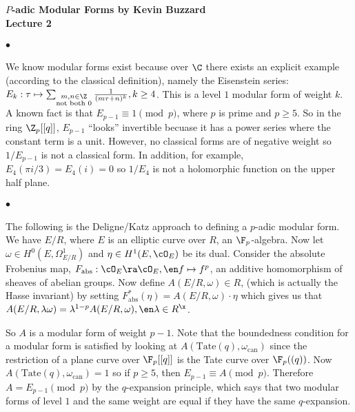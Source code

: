\documentclass[12pt]{article}
\begin{document}
\begin{center}
\Large \textbf{$P$-adic Modular Forms by Kevin Buzzard\\
Lecture 2}
\end{center}

\paragraph{$\bullet$}
We know modular forms exist because over $\C$ there exists an explicit
example (according to the classical definition), namely the Eisenstein
series: $E_k : \tau \mapsto \sum_{\substack{m,n\in\Z\\ \text{not both }0}}
\frac{1}{(m\tau + n)^k}, k \geq 4$.
This is a level $1$ modular form of weight $k$.
A known fact is that $E_{p-1} \equiv 1 \pmod{p}$, where $p$ is prime and $p
\geq 5$.
So in the ring $\Z_p[[q]]$, $E_{p-1}$ ``looks'' invertible becuase it has a
power series where the constant term is a unit.
However, no classical forms are of negative weight so $1/E_{p-1}$ is not a
classical form.
In addition, for example, $E_4(\pi i/3) = E_4(i) = 0$ so $1/E_4$ is not a
holomorphic function on the upper half plane.

\paragraph{$\bullet$}
The following is the Deligne/Katz approach to defining a $p$-adic modular
form.
\\

We have $E/R$, where $E$ is an elliptic curve over $R$, an $\F_p$-algebra.
Now let $\omega \in H^0(E, \Omega^1_{E/R})$ and $\eta \in H^1(E,\cO_E)$ be
its dual.
Consider the absolute Frobenius map, $F_{\text{abs}} : \cO_E \ra \cO_E,\en f
\mapsto f^p$, an additive homomorphism of sheaves of abelian groups.
Now define $A(E/R,\omega) \in R$, (which is actually the Hasse invariant) by
setting $F_{\text{abs}}^*(\eta) = A(E/R,\omega) \cdot \eta$ which gives us
that $A(E/R, \lambda \omega) = \lambda^{1-p} A(E/R, \omega), \en \lambda \in
R^{\x}$.

So $A$ is a modular form of weight $p-1$.
Note that the boundedness condition for a modular form is satisfied by
looking at $A(\text{Tate}(q),\omega_{\text{can}})$ since the restriction of
a plane curve over $\F_p[[q]]$ is the Tate curve over $\F_p((q))$.
Now $A(\text{Tate}(q),\omega_{\text{can}}) = 1$ so if $p \geq 5$, then
$E_{p-1} \equiv A \pmod{p}$.
Therefore $A = E_{p-1} \pmod{p}$ by the $q$-expansion principle, which says
that two modular forms of level $1$ and the same weight are equal if they
have the same $q$-expansion.
\end{document}
